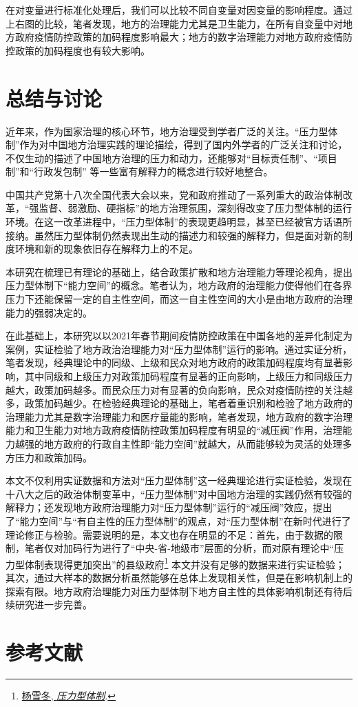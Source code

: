 \documentclass[
  12pt,
]{ctexart}
\begin{document}
在对变量进行标准化处理后，我们可以比较不同自变量对因变量的影响程度。通过上右图的比较，笔者发现，地方的治理能力尤其是卫生能力，在所有自变量中对地方政府疫情防控政策的加码程度影响最大；地方的数字治理能力对地方政府疫情防控政策的加码程度也有较大影响。

\hypertarget{ux603bux7ed3ux4e0eux8ba8ux8bba}{%
\section{总结与讨论}\label{ux603bux7ed3ux4e0eux8ba8ux8bba}}

近年来，作为国家治理的核心环节，地方治理受到学者广泛的关注。``压力型体制''作为对中国地方治理实践的理论描绘，得到了国内外学者的广泛关注和讨论，不仅生动的描述了中国地方治理的压力和动力，还能够对``目标责任制''、``项目制''和``行政发包制'' 等一些富有解释力的概念进行较好地整合。

中国共产党第十八次全国代表大会以来，党和政府推动了一系列重大的政治体制改革，``强监督、弱激励、硬指标''的地方治理氛围，深刻得改变了压力型体制的运行环境。在这一改革进程中，``压力型体制''的表现更趋明显，甚至已经被官方话语所接纳。虽然压力型体制仍然表现出生动的描述力和较强的解释力，但是面对新的制度环境和新的现象依旧存在解释力上的不足。

本研究在梳理已有理论的基础上，结合政策扩散和地方治理能力等理论视角，提出压力型体制下``能力空间''的概念。笔者认为，地方政府的治理能力使得他们在各界压力下还能保留一定的自主性空间，而这一自主性空间的大小是由地方政府的治理能力的强弱决定的。

在此基础上，本研究以以2021年春节期间疫情防控政策在中国各地的差异化制定为案例，实证检验了地方政治治理能力对``压力型体制''运行的影响。通过实证分析，笔者发现，经典理论中的同级、上级和民众对地方政府的政策加码程度均有显著影响，其中同级和上级压力对政策加码程度有显著的正向影响，上级压力和同级压力越大，政策加码越多。而民众压力对有显著的负向影响，民众对疫情防控的关注越多，政策加码越少。在检验经典理论的基础上，笔者着重识别和检验了地方政府的治理能力尤其是数字治理能力和医疗量能的影响，笔者发现，地方政府的数字治理能力和卫生能力对地方政府疫情防控政策加码程度有明显的``减压阀''作用，治理能力越强的地方政府的行政自主性即``能力空间''就越大，从而能够较为灵活的处理多方压力和政策加码。

本文不仅利用实证数据和方法对``压力型体制''这一经典理论进行实证检验，发现在十八大之后的政治体制变革中，``压力型体制''对中国地方治理的实践仍然有较强的解释力；还发现地方政府治理能力对``压力型体制''运行的``减压阀''效应，提出了``能力空间''与``有自主性的压力型体制''的观点，对``压力型体制''在新时代进行了理论修正与检验。需要说明的是，本文也存在明显的不足：首先，由于数据的限制，笔者仅对加码行为进行了``中央-省-地级市''层面的分析，而对原有理论中``压力型体制表现得更加突出''的县级政府\footnote{\protect\hyperlink{ref-YangXueDong2012}{杨雪冬, \emph{压力型体制}}.} 本文并没有足够的数据来进行实证检验；其次，通过大样本的数据分析虽然能够在总体上发现相关性，但是在影响机制上的探索有限。地方政府治理能力对压力型体制下地方自主性的具体影响机制还有待后续研究进一步完善。

\newpage

\hypertarget{ux53c2ux8003ux6587ux732e}{%
\section{参考文献}\label{ux53c2ux8003ux6587ux732e}}
\end{document}

